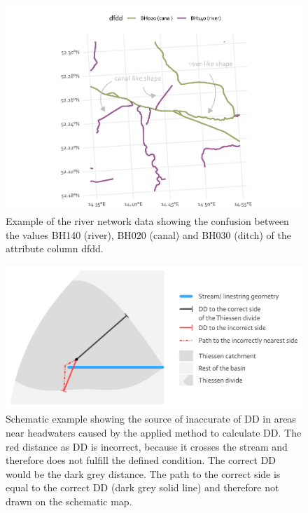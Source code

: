 \documentclass[fleqn,10pt]{wlscirep}
\begin{document}
\begin{figure}[H]

{\centering \includegraphics[width=0.8\linewidth]{data_descriptor/tex/figure-rivercanalconfusionplot-1} 

}

\caption{Example of the river network data showing the confusion between the values BH140 (river), BH020 (canal) and BH030 (ditch) of the attribute column dfdd.}\label{fig:rivercanalconfusionplot}
\end{figure}

\normalsize

\small

\begin{figure}[H]

{\centering \includegraphics[width=0.7\linewidth]{data_descriptor/tex/dd_inaccuracies} 

}

\caption{Schematic example showing the source of inaccurate of DD in areas near headwaters caused by the applied method to calculate DD. The red distance as DD is incorrect, because it crosses the stream and therefore does not fulfill the defined condition. The correct DD would be the dark grey distance. The path to the correct side is equal to the correct DD (dark grey solid line) and therefore not drawn on the schematic map.}\label{fig:ddinaccuracies}
\end{figure}
\end{document}
